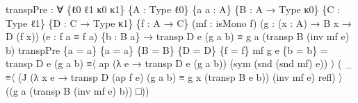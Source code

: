 \documentclass[
  11pt,
  oneside,
  article]{memoir}
\newenvironment{Shaded}{}{}
\newcommand{\NormalTok}[1]{#1}
\newcommand{\OtherTok}[1]{\textcolor[rgb]{0.00,0.44,0.13}{#1}}
\theoremstyle{definition}
\theoremstyle{plain}
\newcommand{\0}{\textsf{0}}
\newcommand{\1}{\tn{\textsf{1}}}
\begin{document}
\begin{Shaded}
\begin{Highlighting}[]
\NormalTok{transpPre }\OtherTok{:} \OtherTok{∀} \OtherTok{\{}\NormalTok{ℓ0 ℓ1 κ0 κ1}\OtherTok{\}} \OtherTok{\{}\NormalTok{A }\OtherTok{:}\NormalTok{ Type ℓ0}\OtherTok{\}} \OtherTok{\{}\NormalTok{a a\textquotesingle{} }\OtherTok{:}\NormalTok{ A}\OtherTok{\}} \OtherTok{\{}\NormalTok{B }\OtherTok{:}\NormalTok{ A }\OtherTok{→}\NormalTok{ Type κ0}\OtherTok{\}}
              \OtherTok{\{}\NormalTok{C }\OtherTok{:}\NormalTok{ Type ℓ1}\OtherTok{\}} \OtherTok{\{}\NormalTok{D }\OtherTok{:}\NormalTok{ C }\OtherTok{→}\NormalTok{ Type κ1}\OtherTok{\}} \OtherTok{\{}\NormalTok{f }\OtherTok{:}\NormalTok{ A }\OtherTok{→}\NormalTok{ C}\OtherTok{\}}
              \OtherTok{(}\NormalTok{mf }\OtherTok{:}\NormalTok{ isMono f}\OtherTok{)} \OtherTok{(}\NormalTok{g }\OtherTok{:} \OtherTok{(}\NormalTok{x }\OtherTok{:}\NormalTok{ A}\OtherTok{)} \OtherTok{→}\NormalTok{ B x }\OtherTok{→}\NormalTok{ D }\OtherTok{(}\NormalTok{f x}\OtherTok{))}
              \OtherTok{(}\NormalTok{e }\OtherTok{:}\NormalTok{ f a ≡ f a\textquotesingle{}}\OtherTok{)} \OtherTok{\{}\NormalTok{b }\OtherTok{:}\NormalTok{ B a}\OtherTok{\}}
              \OtherTok{→}\NormalTok{ transp D e }\OtherTok{(}\NormalTok{g a b}\OtherTok{)}\NormalTok{ ≡ g a\textquotesingle{} }\OtherTok{(}\NormalTok{transp B }\OtherTok{(}\NormalTok{inv mf e}\OtherTok{)}\NormalTok{ b}\OtherTok{)}
\NormalTok{transpPre }\OtherTok{\{}\NormalTok{a }\OtherTok{=}\NormalTok{ a}\OtherTok{\}} \OtherTok{\{}\NormalTok{a\textquotesingle{} }\OtherTok{=}\NormalTok{ a\textquotesingle{}}\OtherTok{\}} \OtherTok{\{}\NormalTok{B }\OtherTok{=}\NormalTok{ B}\OtherTok{\}} \OtherTok{\{}\NormalTok{D }\OtherTok{=}\NormalTok{ D}\OtherTok{\}} \OtherTok{\{}\NormalTok{f }\OtherTok{=}\NormalTok{ f}\OtherTok{\}}\NormalTok{ mf g e }\OtherTok{\{}\NormalTok{b }\OtherTok{=}\NormalTok{ b}\OtherTok{\}} \OtherTok{=} 
\NormalTok{    transp D e }\OtherTok{(}\NormalTok{g a b}\OtherTok{)}  
\NormalTok{        ≡〈 ap }\OtherTok{(λ}\NormalTok{ e\textquotesingle{} }\OtherTok{→}\NormalTok{ transp D e\textquotesingle{} }\OtherTok{(}\NormalTok{g a b}\OtherTok{))} \OtherTok{(}\NormalTok{sym }\OtherTok{(}\NormalTok{snd }\OtherTok{(}\NormalTok{snd mf}\OtherTok{)}\NormalTok{ e}\OtherTok{))}\NormalTok{ 〉 }
    \OtherTok{(} \OtherTok{\_}\NormalTok{ ≡〈 }\OtherTok{(}\NormalTok{J }\OtherTok{(λ}\NormalTok{ x e\textquotesingle{} }\OtherTok{→}\NormalTok{ transp D }\OtherTok{(}\NormalTok{ap f e\textquotesingle{}}\OtherTok{)} \OtherTok{(}\NormalTok{g a b}\OtherTok{)}\NormalTok{ ≡ g x }\OtherTok{(}\NormalTok{transp B e\textquotesingle{} b}\OtherTok{))} 
               \OtherTok{(}\NormalTok{inv mf e}\OtherTok{)}\NormalTok{ refl}\OtherTok{)}\NormalTok{ 〉 }
    \OtherTok{((}\NormalTok{g a\textquotesingle{} }\OtherTok{(}\NormalTok{transp B }\OtherTok{(}\NormalTok{inv mf e}\OtherTok{)}\NormalTok{ b}\OtherTok{))}\NormalTok{ □}\OtherTok{))}


\end{Highlighting}
\end{Shaded}
\end{document}
